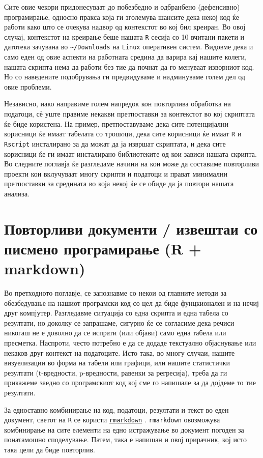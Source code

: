 \documentclass[
]{book}
\begin{document}
Сите овие чекори придонесуваат до побезбедно и одбранбено (дефенсивно) програмирање, односно пракса која ги зголемува шансите дека некој код ќе работи како што се очекува надвор од контекстот во кој бил креиран. Во овој случај, контекстот на креирање беше нашата \texttt{R} сесија со 10 вчитани пакети и датотека зачувана во \texttt{\textasciitilde{}/Downloads} на \texttt{Linux} оперативен систем. Видовме дека и само еден од овие аспекти на работната средина да варира кај нашите колеги, нашата скрипта нема да работи без тие да почнат да го менуваат изворниот код. Но со наведените подобрувања ги предвидуваме и надминуваме голем дел од овие проблеми.

Независно, иако направиме голем напредок кон повторлива обработка на податоци, сѐ уште правиме некакви претпоставки за контекстот во кој скриптата ќе биде користена. На пример, претпоставуваме дека сите потенцијални корисници ќе имаат табелата со трошoци, дека сите корисници ќе имаат \texttt{R} и \texttt{Rscript} инсталирано за да можат да ја извршат скриптата, и дека сите корисници ќе ги имаат инсталирано библиотеките од кои зависи нашата скрипта. Во следните поглавја ќе разгледаме начини на кои може да составиме повторливи проекти кои вклучуваат многу скрипти и податоци и прават минимални претпоставки за средината во која некој ќе се обиде да ја повтори нашата анализа.

\hypertarget{rmd}{%
\chapter{Повторливи документи / извештаи со писмено програмирање (R + markdown)}\label{rmd}}

Во претходното поглавје, се запознавме со некои од главните методи за обезбедување на нашиот програмски код со цел да биде фунцкионален и на нечиј друг компјутер. Разгледавме ситуација со една скрипта и една табела со резултати, но доколку се запрашаме, сигурно ќе се согласиме дека речиси никогаш не е доволно да се испрати (или објави) само една табела или пресметка. Наспроти, често потребно е да се додаде текстуално објаснување или некаков друг контекст на податоците. Исто така, во многу случаи, нашите визуелизации во форма на табели или графици, или нашите статистички резултати (t-вредности, p-вредности, равенки за регресија), треба да ги прикажеме заедно со програмскиот код кој сме го напишале за да дојдеме то тие резултати.

За едноставно комбинирање на код, податоци, резултати и текст во еден документ, светот на \texttt{R} се користи \href{https://www.rdocumentation.org/packages/rmarkdown/versions/2.6}{\texttt{rmarkdown}} \citep{R-rmarkdown}. \texttt{rmarkdown} овозможува комбинирање на сите елементи на едно истражување во документ погоден за понатамошно споделување. Патем, така е напишан и овој прирачник, кој исто така цели да биде повторлив.
\end{document}
